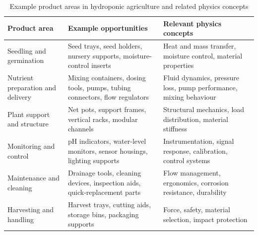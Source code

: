 \begin{table}[htbp]
\centering
\caption{Example product areas in hydroponic agriculture and related physics concepts}
\label{tab:session1-opportunity-areas}
\renewcommand{\arraystretch}{1.2}
\begin{tabularx}{\textwidth}{|>{\raggedright\arraybackslash}p{}|>{\raggedright\arraybackslash}X|>{\raggedright\arraybackslash}p{}|}
\hline
\textbf{Product area} & \textbf{Example opportunities} & \textbf{Relevant physics concepts} \\
\hline
Seedling and germination & Seed trays, seed holders, nursery supports, moisture-control inserts & Heat and mass transfer, moisture control, material properties \\
\hline
Nutrient preparation and delivery & Mixing containers, dosing tools, pumps, tubing connectors, flow regulators & Fluid dynamics, pressure loss, pump performance, mixing behaviour \\
\hline
Plant support and structure & Net pots, support frames, vertical racks, modular channels & Structural mechanics, load distribution, material stiffness \\
\hline
Monitoring and control & pH indicators, water-level monitors, sensor housings, lighting supports & Instrumentation, signal response, calibration, control systems \\
\hline
Maintenance and cleaning & Drainage tools, cleaning devices, inspection aids, quick-replacement parts & Flow management, ergonomics, corrosion resistance, durability \\
\hline
Harvesting and handling & Harvest trays, cutting aids, storage bins, packaging supports & Force, safety, material selection, impact protection \\
\hline
\end{tabularx}
\end{table}